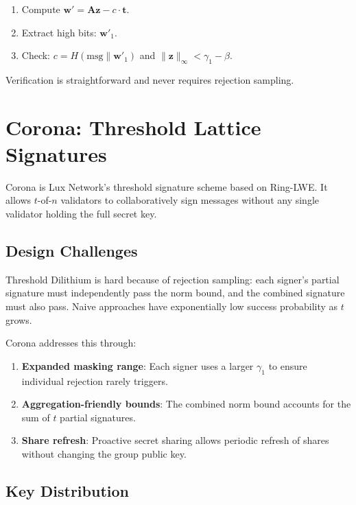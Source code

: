 \documentclass[11pt,a4paper]{article}
\begin{document}
\begin{enumerate}[nosep]
  \item Compute $\mathbf{w}' = \mathbf{A}\mathbf{z} - c \cdot \mathbf{t}$.
  \item Extract high bits: $\mathbf{w}'_1$.
  \item Check: $c = H(\text{msg} \| \mathbf{w}'_1)$ and $\|\mathbf{z}\|_\infty < \gamma_1 - \beta$.
\end{enumerate}

Verification is straightforward and never requires rejection sampling.

\section{Corona: Threshold Lattice Signatures}

Corona is Lux Network's threshold signature scheme based on Ring-LWE. It allows
$t$-of-$n$ validators to collaboratively sign messages without any single validator
holding the full secret key.

\subsection{Design Challenges}

Threshold Dilithium is hard because of rejection sampling: each signer's partial
signature must independently pass the norm bound, and the combined signature must also
pass. Naive approaches have exponentially low success probability as $t$ grows.

Corona addresses this through:
\begin{enumerate}[nosep]
  \item \textbf{Expanded masking range}: Each signer uses a larger $\gamma_1$ to ensure
    individual rejection rarely triggers.
  \item \textbf{Aggregation-friendly bounds}: The combined norm bound accounts for the sum
    of $t$ partial signatures.
  \item \textbf{Share refresh}: Proactive secret sharing allows periodic refresh of shares
    without changing the group public key.
\end{enumerate}

\subsection{Key Distribution}
\end{document}
